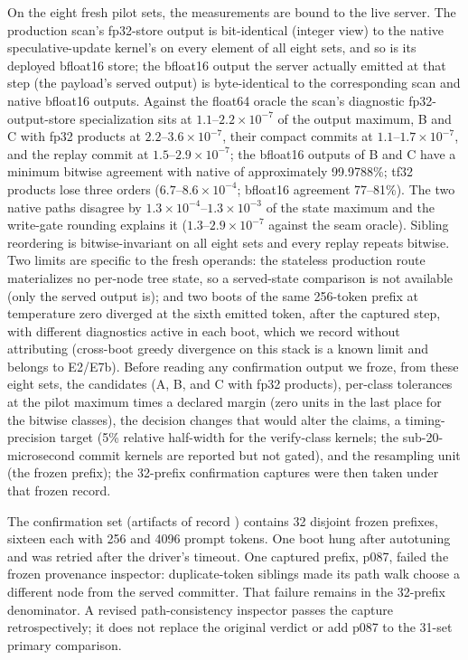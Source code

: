 \documentclass[conference]{IEEEtran}
\begin{document}
On the eight fresh pilot sets, the measurements are bound to the live server. The production scan's fp32-store output is bit-identical (integer view) to the native speculative-update kernel's on every element of all eight sets, and so is its deployed bfloat16 store; the bfloat16 output the server actually emitted at that step (the payload's served output) is byte-identical to the corresponding scan and native bfloat16 outputs. Against the float64 oracle the scan's diagnostic fp32-output-store specialization sits at $1.1$--$2.2\times10^{-7}$ of the output maximum, B and C with fp32 products at $2.2$--$3.6\times10^{-7}$, their compact commits at $1.1$--$1.7\times10^{-7}$, and the replay commit at $1.5$--$2.9\times10^{-7}$; the bfloat16 outputs of B and C have a minimum bitwise agreement with native of approximately 99.9788\%; tf32 products lose three orders ($6.7$--$8.6\times10^{-4}$; bfloat16 agreement 77--81\%). The two native paths disagree by $1.3\times10^{-4}$--$1.3\times10^{-3}$ of the state maximum and the write-gate rounding explains it ($1.3$--$2.9\times10^{-7}$ against the seam oracle). Sibling reordering is bitwise-invariant on all eight sets and every replay repeats bitwise. Two limits are specific to the fresh operands: the stateless production route materializes no per-node tree state, so a served-state comparison is not available (only the served output is); and two boots of the same 256-token prefix at temperature zero diverged at the sixth emitted token, after the captured step, with different diagnostics active in each boot, which we record without attributing (cross-boot greedy divergence on this stack is a known limit and belongs to E2/E7b). Before reading any confirmation output we froze, from these eight sets, the candidates (A, B, and C with fp32 products), per-class tolerances at the pilot maximum times a declared margin (zero units in the last place for the bitwise classes), the decision changes that would alter the claims, a timing-precision target (5\% relative half-width for the verify-class kernels; the sub-20-microsecond commit kernels are reported but not gated), and the resampling unit (the frozen prefix); the 32-prefix confirmation captures were then taken under that frozen record.

The confirmation set (artifacts of record ) contains 32 disjoint frozen prefixes, sixteen each with 256 and 4096 prompt tokens. One boot hung after autotuning and was retried after the driver's timeout. One captured prefix, p087, failed the frozen provenance inspector: duplicate-token siblings made its path walk choose a different node from the served committer. That failure remains in the 32-prefix denominator. A revised path-consistency inspector passes the capture retrospectively; it does not replace the original verdict or add p087 to the 31-set primary comparison.
\end{document}
